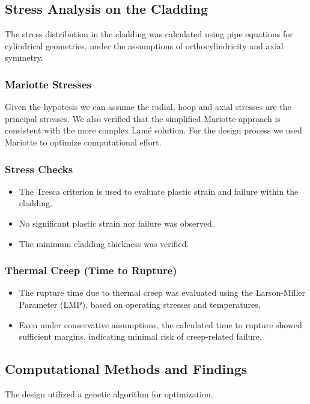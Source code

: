 \documentclass[11pt,a4paper,twoside]{article}
\begin{document}
\subsection{Stress Analysis on the Cladding}
The stress distribution in the cladding was calculated using pipe equations for cylindrical geometries, under the assumptions of orthocylindricity and axial symmetry.

\subsubsection{Mariotte Stresses}
Given the hypotesis we can assume the radial, hoop and axial stresses are the principal stresses.  
We also verified that the simplified Mariotte approach is consistent with the more complex Lamé solution. For the design process we used Mariotte to optimize computational effort.  

\subsubsection{Stress Checks}
\begin{itemize}
    \item The Tresca criterion is used to evaluate plastic strain and failure within the cladding. 
    \item No significant plastic strain nor failure was observed.
    \item The minimum cladding thickness was verified.
\end{itemize}

\subsubsection{Thermal Creep (Time to Rupture)}
\begin{itemize}
    \item The rupture time due to thermal creep was evaluated using the Larson-Miller Parameter (LMP), based on operating stresses and temperatures.
    \item Even under conservative assumptions, the calculated time to rupture showed sufficient margins, indicating minimal risk of creep-related failure.
\end{itemize}


\subsection{Computational Methods and Findings}
The design utilized a genetic algorithm for optimization.
\end{document}
